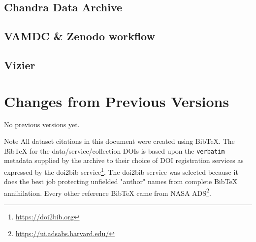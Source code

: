 \documentclass[11pt,a4paper]{ivoa}
\begin{document}
\subsection{Chandra Data Archive}
\subsection{VAMDC \& Zenodo workflow}
\subsection{Vizier}

\section{Changes from Previous Versions}

No previous versions yet.

\clearpage
\begin{admonition}{Note}
All dataset citations in this document were created using BibTeX. The BibTeX for the data/service/collection DOIs is based upon the \texttt{verbatim} metadata supplied by the archive to their choice of DOI registration services as expressed by the doi2bib service\footnote{\url{https://doi2bib.org}}. The doi2bib service was selected because it does the best job protecting unfielded "author" names from complete BibTeX annihilation.
Every other reference BibTeX came from NASA ADS\footnote{\url{https://ui.adsabs.harvard.edu/}}.
\end{admonition}%
%

\end{document}
